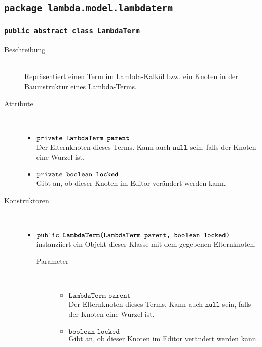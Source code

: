 \subsection{\texttt{package lambda.model.lambdaterm}}

\subsubsection{\normalfont \texttt{public abstract class \textbf{LambdaTerm} }}

\begin{description}
\item[Beschreibung] \hfill \\ Repräsentiert einen Term im Lambda-Kalkül bzw. ein Knoten in der Baumstruktur eines Lambda-Terms.

\item[Attribute] \hfill \\
	\vspace{-.8cm}
	\begin{itemize}
		\item $\texttt{private LambdaTerm \textbf{parent}}$ \\ Der Elternknoten dieses Terms. Kann auch $\texttt{null}$ sein, falls der Knoten eine Wurzel ist.
		\item $\texttt{private boolean \textbf{locked}}$ \\ Gibt an, ob dieser Knoten im Editor verändert werden kann.
	\end{itemize}
	
\item[Konstruktoren] \hfill \\
	\vspace{-.8cm}
	\begin{itemize}
		\item $\texttt{public \textbf{LambdaTerm}(LambdaTerm parent, boolean locked)}$ \\ instanziiert ein Objekt dieser Klasse mit dem gegebenen Elternknoten.
		\begin{description}
			\item[Parameter] \hfill \\
			\vspace{-.8cm}
			\begin{itemize}
				\item $\texttt{LambdaTerm parent}$ \\ Der Elternknoten dieses Terms. Kann auch $\texttt{null}$ sein, falls der Knoten eine Wurzel ist.
				\item $\texttt{boolean locked}$ \\ Gibt an, ob dieser Knoten im Editor verändert werden kann.
			\end{itemize}
		\end{description}
	\end{itemize}
	

\end{description}
